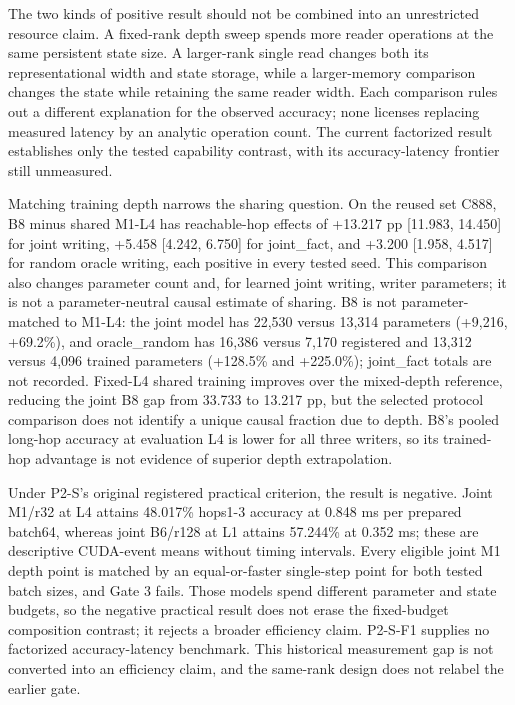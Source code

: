 The two kinds of positive result should not be combined into an unrestricted resource
claim. A fixed-rank depth sweep spends more reader operations at the same persistent
state size. A larger-rank single read changes both its representational width and
state storage, while a larger-memory comparison changes the state while retaining the
same reader width. Each comparison rules out a different explanation for the observed  %
accuracy; none licenses replacing measured latency by an analytic operation count.
The current factorized result establishes only the tested capability contrast, with
its accuracy-latency frontier still unmeasured.  %

Matching training depth narrows the sharing question. On the reused set C888, B8 minus
shared M1-L4 has reachable-hop effects of +13.217 pp [11.983, 14.450] for joint writing,
+5.458 [4.242, 6.750] for joint\_fact, and +3.200 [1.958, 4.517] for random oracle
writing, each positive in every tested seed. This comparison also changes parameter count and, for learned  %
joint writing, writer parameters; it is not a parameter-neutral causal estimate
of sharing. B8 is not parameter-matched to M1-L4: the joint model has 22,530 versus
13,314 parameters (+9,216, +69.2\%), and oracle\_random has 16,386 versus 7,170 registered
and 13,312 versus 4,096 trained parameters (+128.5\% and +225.0\%); joint\_fact totals are
not recorded. Fixed-L4 shared training improves over the mixed-depth  %
reference, reducing the joint B8 gap from 33.733 to 13.217 pp, but the selected
protocol comparison does not identify a unique causal fraction due to depth.
 B8’s pooled long-hop accuracy at evaluation L4 is lower for all three  %
writers, so its trained-hop advantage is not evidence of superior depth extrapolation.

Under P2-S’s original registered practical criterion, the result is negative. Joint M1/\allowbreak{}r32 at L4 attains 48.017\% hops1-3 accuracy  %
at 0.848 ms per prepared batch64, whereas joint B6/\allowbreak{}r128 at L1 attains 57.244\% at
0.352 ms; these are descriptive CUDA-event means without timing intervals.  %
Every eligible joint M1 depth point is matched by an equal-or-faster single-step
point for both tested batch sizes, and Gate 3 fails. Those models spend  %
different parameter and state budgets, so the negative practical result does not
erase the fixed-budget composition contrast; it rejects a broader efficiency claim.
 P2-S-F1 supplies no factorized accuracy-latency benchmark.  %
 This historical measurement gap is not converted into an efficiency  %
claim, and the same-rank design does not relabel the earlier gate.

